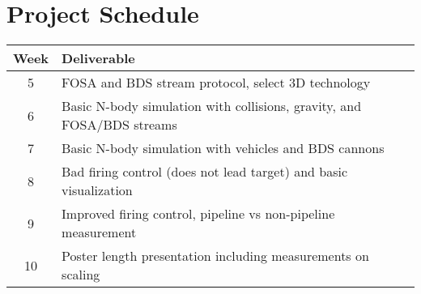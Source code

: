 \section{Project Schedule}

\begin{tabular}{c | l}
Week & Deliverable\\
\hline
5 & FOSA and BDS stream protocol, select 3D technology\\
6 & Basic N-body simulation with collisions, gravity, and FOSA/BDS streams\\
7 & Basic N-body simulation with vehicles and BDS cannons\\
8 & Bad firing control (does not lead target) and basic visualization\\
9 & Improved firing control, pipeline vs non-pipeline measurement\\
10 & Poster length presentation including measurements on scaling\\
\end{tabular}